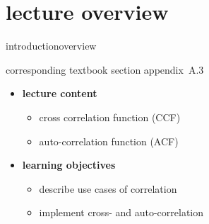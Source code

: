 


\subtitle{module A.3: fundamentals~---~correlation}


	

    \section[overview]{lecture overview}
        \begin{frame}{introduction}{overview}
            \begin{block}{corresponding textbook section}
                    appendix~A.3
            \end{block}

            \begin{itemize}
                \item   \textbf{lecture content}
                    \begin{itemize}
                        \item   cross correlation function (CCF)
                        \item   auto-correlation function (ACF)
                    \end{itemize}
                \bigskip
                \item<2->   \textbf{learning objectives}
                    \begin{itemize}
                        \item   describe use cases of correlation
                        \item   implement cross- and auto-correlation
                    \end{itemize}
            \end{itemize}
        \end{frame}

